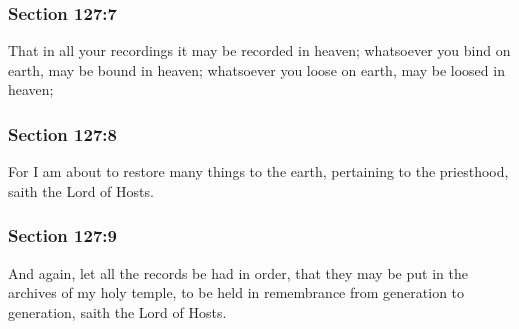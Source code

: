 	\subsubsection{Section 127:7} %
		\label{DC127-7}

		That in all your recordings it may be recorded in heaven; whatsoever you bind on earth, may be bound in heaven; whatsoever you loose on earth, may be loosed in heaven;


	\subsubsection{Section 127:8} %
		\label{DC127-8}

		For I am about to restore many things to the earth, pertaining to the priesthood, saith the Lord of Hosts.


	\subsubsection{Section 127:9} %
		\label{DC127-9}

		And again, let all the records be had in order, that they may be put in the archives of my holy temple, to be held in remembrance from generation to generation, saith the Lord of Hosts.



